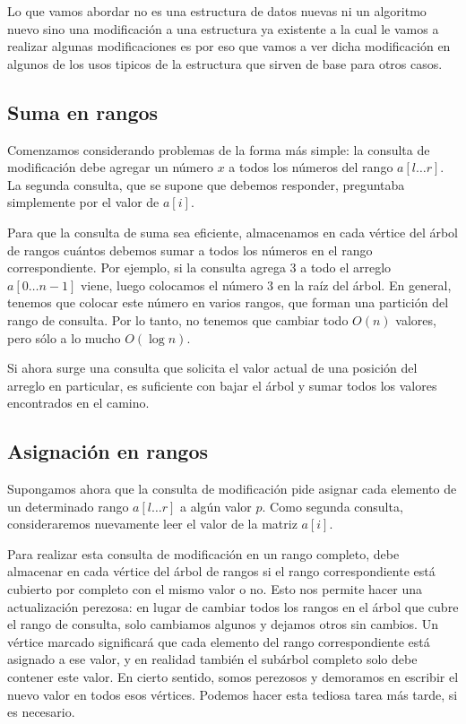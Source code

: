 Lo que vamos abordar no es una estructura de datos nuevas ni un algoritmo nuevo sino una modificación a una estructura ya existente a la cual le vamos a realizar algunas modificaciones es por eso que vamos a ver dicha modificación en algunos de los usos tipicos de la estructura que sirven de base para otros casos.

\subsection{Suma en rangos}

Comenzamos considerando problemas de la forma más simple: la consulta de modificación debe agregar un número $x$ a todos los números del rango $a[l \dots r]$. La segunda consulta, que se supone que debemos responder, preguntaba simplemente por el valor de $a[i]$.

Para que la consulta de suma sea eficiente, almacenamos en cada vértice del árbol de rangos cuántos debemos sumar a todos los números en el rango correspondiente. Por ejemplo, si la consulta agrega 3 a todo el arreglo $a[0 \dots n-1]$ viene, luego colocamos el número 3 en la raíz del árbol. En general, tenemos que colocar este número en varios rangos, que forman una partición del rango de consulta. Por lo tanto, no tenemos que cambiar todo $O(n)$ valores, pero sólo a lo mucho $O(\log n)$.

Si ahora surge una consulta que solicita el valor actual de una posición del arreglo en particular, es suficiente con bajar el árbol y sumar todos los valores encontrados en el camino.

\subsection{Asignación en rangos}

Supongamos ahora que la consulta de modificación pide asignar cada elemento de un determinado rango $a[l \dots r]$ a algún valor $p$. Como segunda consulta, consideraremos nuevamente leer el valor de la matriz $a[i]$.

Para realizar esta consulta de modificación en un rango completo, debe almacenar en cada vértice del árbol de rangos si el rango correspondiente está cubierto por completo con el mismo valor o no. Esto nos permite hacer una actualización perezosa: en lugar de cambiar todos los rangos en el árbol que cubre el rango de consulta, solo cambiamos algunos y dejamos otros sin cambios. Un vértice marcado significará que cada elemento del rango correspondiente está asignado a ese valor, y en realidad también el subárbol completo solo debe contener este valor. En cierto sentido, somos perezosos y demoramos en escribir el nuevo valor en todos esos vértices. Podemos hacer esta tediosa tarea más tarde, si es necesario.

